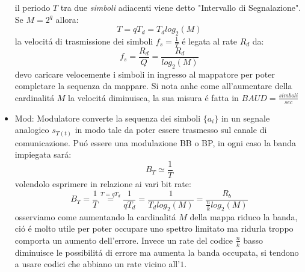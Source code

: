 \begin{itemize}
{\begin{figure}[H]
{\begin{tikzpicture}
                    \end{tikzpicture}
                }
                \hfill
            \end{figure}
            il periodo $T$ tra due \emph{simboli} adiacenti viene detto "Intervallo di Segnalazione". Se $M=2^q$ allora:
            \[
                T = qT_d =T_d log_{2}(M)  
            \]
            la velocitá di trasmissione dei simboli $f_s = \frac{1}{T}$ é legata al rate $R_d$ da:
            \[
                f_s = \frac{R_d}{Q} = \frac{R_d}{log_{2}(M)} 
            \] 
            devo caricare velocemente i simboli in ingresso al mappatore per poter completare la sequenza da mappare. Si nota anhe come
            all'aumentare della cardinalitá $M$ la velocitá diminuisca, la sua misura é fatta in $BAUD = \frac{simboli}{sec}$
        }
        \item {Mod: Modulatore converte la sequenza dei simboli $\{a_i\}$ in un segnale analogico $s_{T(t)}$ in modo tale da poter essere trasmesso  
            sul canale di comunicazione. Puó essere una modulazione {\color{blue}BB} o {\color{red}BP}, in ogni caso la banda impiegata sará:
            \[
                B_T \simeq \frac{1}{T}  
            \]
            volendolo esprimere in relazione ai vari bit rate:
            \[
                B_T = \frac{1}{T} \overset{T = qT_d}{=} \frac{1}{qT_d} = \frac{1}{T_d log_2(M)} = \frac{R_b}{\frac{n}{k} log_2(M)}     
            \]
            osserviamo come aumentando la cardinalitá $M$ della mappa riduco la banda, ció é molto utile per poter occupare uno spettro limitato ma ridurla troppo
            comporta un aumento dell'errore. Invece un rate del codice $\frac{n}{k}$ basso diminuisce le possibilitá di errore ma aumenta la banda occupata, si tendono 
            a usare codici che abbiano un rate vicino all'$1$. 
        }
    \end{itemize}
